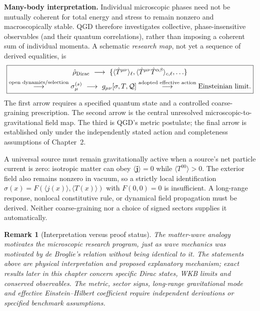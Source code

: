 \documentclass[11pt,a4paper]{article}
\newtheorem{remark}{Remark}[section]
\begin{document}
\noindent\textbf{Many-body interpretation.}
Individual microscopic phases need not be mutually coherent for total energy and stress to remain nonzero and macroscopically stable.  QGD therefore investigates collective, phase-insensitive observables (and their quantum correlations), rather than imposing a coherent sum of individual momenta.  A schematic \emph{research map}, not yet a sequence of derived equalities, is
\begin{equation}\label{eq:qgd-physical-pipeline}
\boxed{\begin{gathered}
  \hat\rho_{\rm Dirac}\ \longrightarrow\
  \{\langle\hat T^{\mu\nu}\rangle_\ell,
       \langle\hat T^{\mu\nu}\hat T^{\alpha\beta}\rangle_{c,\ell},\ldots\}\\
  \overset{\text{open dynamics/selection}}{\longrightarrow}
  \sigma_\mu^{(s)}\ \longrightarrow\ g_{\mu\nu}[\sigma,T,\mathcal Q]
  \overset{\text{adopted effective action}}{\longrightarrow}
  \text{Einsteinian limit}.
\end{gathered}}
\end{equation}
The first arrow requires a specified quantum state and a controlled coarse-graining prescription.  The second arrow is the central unresolved microscopic-to-gravitational field map.  The third is QGD's metric postulate; the final arrow is established only under the independently stated action and completeness assumptions of Chapter~2.

A universal source must remain gravitationally active when a source's net particle current is zero: isotropic matter can obey $\langle\bm j\rangle=0$ while $\langle T^{00}\rangle>0$. The exterior field also remains nonzero in vacuum, so a strictly local identification $\sigma(x)=F(\langle j(x)\rangle,\langle T(x)\rangle)$ with $F(0,0)=0$ is insufficient. A long-range response, nonlocal constitutive rule, or dynamical field propagation must be derived. Neither coarse-graining nor a choice of signed sectors supplies it automatically.

\begin{remark}[Interpretation versus proof status]\label{rem:qgd-debroglie}
The matter-wave analogy motivates the microscopic research program, just as wave mechanics was motivated by de Broglie's relation without being identical to it.  The statements above are \emph{physical interpretation and proposed explanatory mechanism}; exact results later in this chapter concern specific Dirac states, WKB limits and conserved observables. The metric, sector signs, long-range gravitational mode and effective Einstein--Hilbert coefficient require independent derivations or specified benchmark assumptions.
\end{remark}
\end{document}
